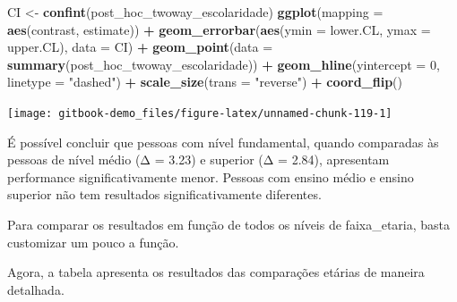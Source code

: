 \documentclass[
]{book}
\newenvironment{Shaded}{\begin{snugshade}}{\end{snugshade}}
\newcommand{\DataTypeTok}[1]{\textcolor[rgb]{0.13,0.29,0.53}{#1}}
\newcommand{\DecValTok}[1]{\textcolor[rgb]{0.00,0.00,0.81}{#1}}
\newcommand{\KeywordTok}[1]{\textcolor[rgb]{0.13,0.29,0.53}{\textbf{#1}}}
\newcommand{\NormalTok}[1]{#1}
\newcommand{\OperatorTok}[1]{\textcolor[rgb]{0.81,0.36,0.00}{\textbf{#1}}}
\newcommand{\StringTok}[1]{\textcolor[rgb]{0.31,0.60,0.02}{#1}}
\begin{document}
\begin{Shaded}
\begin{Highlighting}[]
\NormalTok{CI <-}\StringTok{ }\KeywordTok{confint}\NormalTok{(post_hoc_twoway_escolaridade)}
\KeywordTok{ggplot}\NormalTok{(}\DataTypeTok{mapping =} \KeywordTok{aes}\NormalTok{(contrast, estimate)) }\OperatorTok{+}
\StringTok{  }\KeywordTok{geom_errorbar}\NormalTok{(}\KeywordTok{aes}\NormalTok{(}\DataTypeTok{ymin =}\NormalTok{ lower.CL, }\DataTypeTok{ymax =}\NormalTok{ upper.CL), }\DataTypeTok{data =}\NormalTok{ CI) }\OperatorTok{+}
\StringTok{  }\KeywordTok{geom_point}\NormalTok{(}\DataTypeTok{data =} \KeywordTok{summary}\NormalTok{(post_hoc_twoway_escolaridade)) }\OperatorTok{+}
\StringTok{  }\KeywordTok{geom_hline}\NormalTok{(}\DataTypeTok{yintercept =} \DecValTok{0}\NormalTok{, }\DataTypeTok{linetype =} \StringTok{"dashed"}\NormalTok{) }\OperatorTok{+}\StringTok{ }
\StringTok{  }\KeywordTok{scale_size}\NormalTok{(}\DataTypeTok{trans =} \StringTok{"reverse"}\NormalTok{) }\OperatorTok{+}\StringTok{ }
\StringTok{  }\KeywordTok{coord_flip}\NormalTok{()}
\end{Highlighting}
\end{Shaded}

\begin{center}\texttt{[image: gitbook-demo\_files/figure-latex/unnamed-chunk-119-1]} \end{center}

É possível concluir que pessoas com nível fundamental, quando comparadas
às pessoas de nível médio (Δ = 3.23) e superior (Δ = 2.84), apresentam
performance significativamente menor. Pessoas com ensino médio e ensino
superior não tem resultados significativamente diferentes.

Para comparar os resultados em função de todos os níveis de
faixa\_etaria, basta customizar um pouco a função.

\begin{Shaded}
\end{Shaded}

Agora, a tabela apresenta os resultados das comparações etárias de
maneira detalhada.
\end{document}
